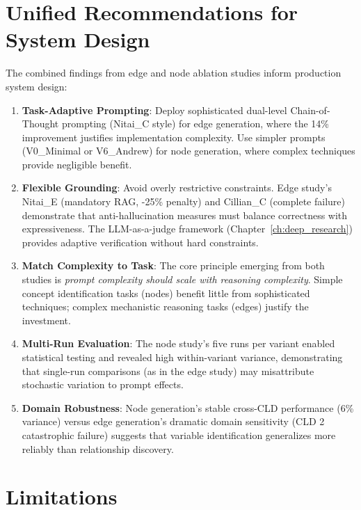 \section{Unified Recommendations for System Design}

The combined findings from edge and node ablation studies inform production system design:

\begin{enumerate}
    \item \textbf{Task-Adaptive Prompting}: Deploy sophisticated dual-level Chain-of-Thought prompting (Nitai\_C style) for edge generation, where the 14\% improvement justifies implementation complexity. Use simpler prompts (V0\_Minimal or V6\_Andrew) for node generation, where complex techniques provide negligible benefit.
    
    \item \textbf{Flexible Grounding}: Avoid overly restrictive constraints. Edge study's Nitai\_E (mandatory RAG, -25\% penalty) and Cillian\_C (complete failure) demonstrate that anti-hallucination measures must balance correctness with expressiveness. The LLM-as-a-judge framework (Chapter~\ref{ch:deep_research}) provides adaptive verification without hard constraints.
    
    \item \textbf{Match Complexity to Task}: The core principle emerging from both studies is \textit{prompt complexity should scale with reasoning complexity}. Simple concept identification tasks (nodes) benefit little from sophisticated techniques; complex mechanistic reasoning tasks (edges) justify the investment.
    
    \item \textbf{Multi-Run Evaluation}: The node study's five runs per variant enabled statistical testing and revealed high within-variant variance, demonstrating that single-run comparisons (as in the edge study) may misattribute stochastic variation to prompt effects.
    
    \item \textbf{Domain Robustness}: Node generation's stable cross-CLD performance (6\% variance) versus edge generation's dramatic domain sensitivity (CLD 2 catastrophic failure) suggests that variable identification generalizes more reliably than relationship discovery.
\end{enumerate}

\section{Limitations}

